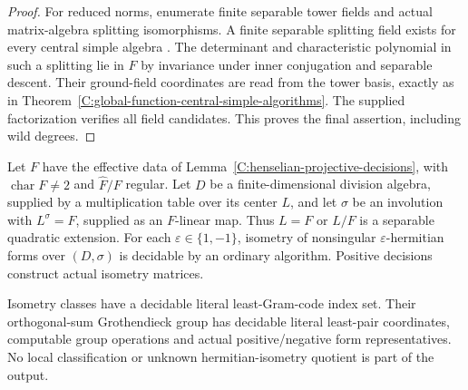 \begin{proof}
For reduced norms, enumerate finite separable tower fields and
actual matrix-algebra splitting isomorphisms. A finite separable
splitting field exists for every central simple algebra
\cite[Proposition 11.8.5, Tag 0752]{C-StacksGlobalFunctionArithmetic}.
The determinant and characteristic polynomial in such a splitting
lie in $F$ by invariance under inner conjugation and separable
descent. Their ground-field coordinates are read from the tower
basis, exactly as in
Theorem~\ref{C:global-function-central-simple-algorithms}.
The supplied factorization verifies all field candidates.
This proves the final assertion, including wild degrees.
\end{proof}

\begin{theorem}
\label{C:henselian-hermitian-isometry}
Let $F$ have the effective data of
Lemma~\ref{C:henselian-projective-decisions}, with
$\operatorname{char}F\ne2$ and $\widehat F/F$ regular.
Let $D$ be a finite-dimensional division algebra, supplied by
a multiplication table over its center $L$, and let $\sigma$
be an involution with $L^\sigma=F$, supplied as an $F$-linear map.
Thus $L=F$ or $L/F$ is a separable quadratic extension.
For each $\varepsilon\in\{1,-1\}$, isometry of nonsingular
$\varepsilon$-hermitian forms over $(D,\sigma)$ is decidable
by an ordinary algorithm. Positive decisions construct actual
isometry matrices.

Isometry classes have a decidable literal least-Gram-code
index set. Their orthogonal-sum Grothendieck group has
decidable literal least-pair coordinates, computable group
operations and actual positive/negative form representatives.
No local classification or unknown hermitian-isometry quotient
is part of the output.
\end{theorem}
